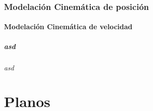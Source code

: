         \subsection{Modelación Cinemática de posición}
        \subsubsection{Modelación Cinemática de velocidad}
            \paragraph{asd} 
                \subparagraph{asd}

        
\chapter{Planos}\label{anexoC}
\thispagestyle{fancy}
    \section{}
        \subsection{}